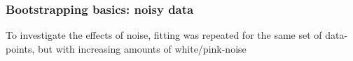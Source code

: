 \subsubsection{Bootstrapping basics: noisy data}

To investigate the effects of noise, fitting was repeated for the same set of data-points, but with increasing amounts of white/pink-noise